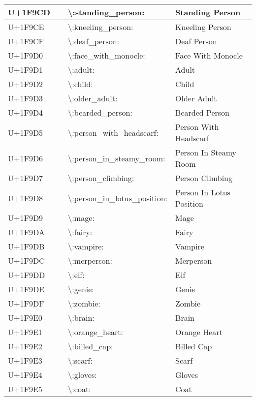 \begin{table}[h]
\begin{tabulary}{\linewidth}{|L|L|L|L|}
\hline
U+1F9CD & 🧍 & {\textbackslash}:standing\_person: & Standing Person \\
\hline
U+1F9CE & 🧎 & {\textbackslash}:kneeling\_person: & Kneeling Person \\
\hline
U+1F9CF & 🧏 & {\textbackslash}:deaf\_person: & Deaf Person \\
\hline
U+1F9D0 & 🧐 & {\textbackslash}:face\_with\_monocle: & Face With Monocle \\
\hline
U+1F9D1 & 🧑 & {\textbackslash}:adult: & Adult \\
\hline
U+1F9D2 & 🧒 & {\textbackslash}:child: & Child \\
\hline
U+1F9D3 & 🧓 & {\textbackslash}:older\_adult: & Older Adult \\
\hline
U+1F9D4 & 🧔 & {\textbackslash}:bearded\_person: & Bearded Person \\
\hline
U+1F9D5 & 🧕 & {\textbackslash}:person\_with\_headscarf: & Person With Headscarf \\
\hline
U+1F9D6 & 🧖 & {\textbackslash}:person\_in\_steamy\_room: & Person In Steamy Room \\
\hline
U+1F9D7 & 🧗 & {\textbackslash}:person\_climbing: & Person Climbing \\
\hline
U+1F9D8 & 🧘 & {\textbackslash}:person\_in\_lotus\_position: & Person In Lotus Position \\
\hline
U+1F9D9 & 🧙 & {\textbackslash}:mage: & Mage \\
\hline
U+1F9DA & 🧚 & {\textbackslash}:fairy: & Fairy \\
\hline
U+1F9DB & 🧛 & {\textbackslash}:vampire: & Vampire \\
\hline
U+1F9DC & 🧜 & {\textbackslash}:merperson: & Merperson \\
\hline
U+1F9DD & 🧝 & {\textbackslash}:elf: & Elf \\
\hline
U+1F9DE & 🧞 & {\textbackslash}:genie: & Genie \\
\hline
U+1F9DF & 🧟 & {\textbackslash}:zombie: & Zombie \\
\hline
U+1F9E0 & 🧠 & {\textbackslash}:brain: & Brain \\
\hline
U+1F9E1 & 🧡 & {\textbackslash}:orange\_heart: & Orange Heart \\
\hline
U+1F9E2 & 🧢 & {\textbackslash}:billed\_cap: & Billed Cap \\
\hline
U+1F9E3 & 🧣 & {\textbackslash}:scarf: & Scarf \\
\hline
U+1F9E4 & 🧤 & {\textbackslash}:gloves: & Gloves \\
\hline
U+1F9E5 & 🧥 & {\textbackslash}:coat: & Coat \\

\end{tabulary}
\end{table}
